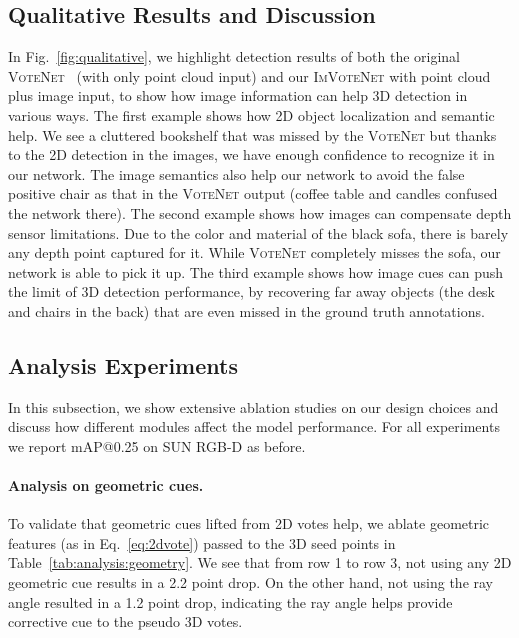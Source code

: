 \documentclass[10pt,twocolumn,letterpaper]{article}
\newcommand{\votenet}{\textsc{VoteNet}\xspace}
\newcommand{\imvotenet}{\textsc{ImVoteNet}\xspace}
\begin{document}
\subsection{Qualitative Results and Discussion}
\label{sec:exp:qual}
In Fig.~\ref{fig:qualitative}, we highlight detection results of both the original \votenet~\cite{voteNet} (with only point cloud input) and our \imvotenet with point cloud plus image input, to show how image information can help 3D detection in various ways. The first example shows how 2D object localization and semantic help. We see a cluttered bookshelf that was missed by the \votenet but thanks to the 2D detection in the images, we have enough confidence to recognize it in our network. The image semantics also help our network to avoid the false positive chair as that in the \votenet output (coffee table and candles confused the network there). The second example shows how images can compensate depth sensor limitations. Due to the color and material of the black sofa, there is barely any depth point captured for it. While \votenet completely misses the sofa, our network is able to pick it up. The third example shows how image cues can push the limit of 3D detection performance, by recovering far away objects (the desk and chairs in the back) that are even missed in the ground truth annotations.

\subsection{Analysis Experiments}
\label{sec:exp:analysis}
In this subsection, we show extensive ablation studies on our design choices and discuss how different modules affect the model performance. For all experiments we report mAP@0.25 on SUN RGB-D as before.

\paragraph{Analysis on geometric cues.} To validate that geometric cues lifted from 2D votes help, we ablate geometric features (as in Eq.~\ref{eq:2dvote}) passed to the 3D seed points in Table~\ref{tab:analysis:geometry}. We see that from row 1 to row 3, not using any 2D geometric cue results in a 2.2 point drop. On the other hand, not using the ray angle resulted in a 1.2 point drop, indicating the ray angle helps provide corrective cue to the pseudo 3D votes.
\end{document}

